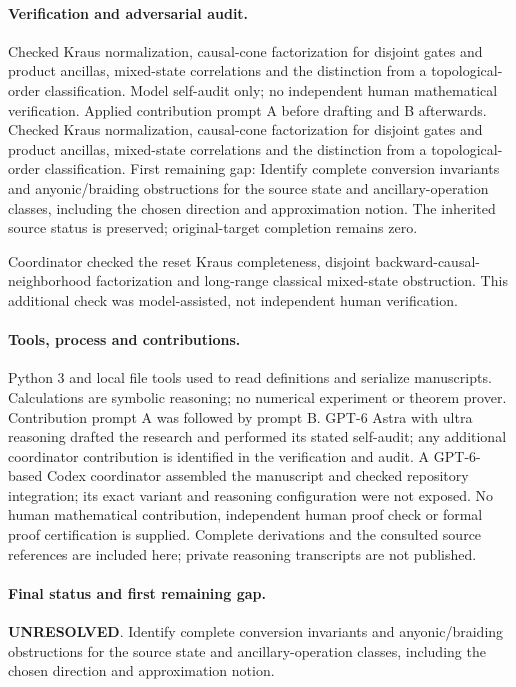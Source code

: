 \documentclass[11pt]{article}
\begin{document}
\paragraph{Verification and adversarial audit.}
Checked Kraus normalization, causal-cone factorization for disjoint gates and product ancillas, mixed-state correlations and the distinction from a topological-order classification. Model self-audit only; no independent human mathematical verification. Applied contribution prompt A before drafting and B afterwards. Checked Kraus normalization, causal-cone factorization for disjoint gates and product ancillas, mixed-state correlations and the distinction from a topological-order classification. First remaining gap: Identify complete conversion invariants and anyonic/braiding obstructions for the source state and ancillary-operation classes, including the chosen direction and approximation notion. The inherited source status is preserved; original-target completion remains zero.

Coordinator checked the reset Kraus completeness, disjoint backward-causal-neighborhood factorization and long-range classical mixed-state obstruction. This additional check was model-assisted, not independent human verification.

\paragraph{Tools, process and contributions.}
Python 3 and local file tools used to read definitions and serialize manuscripts. Calculations are symbolic reasoning; no numerical experiment or theorem prover. Contribution prompt A was followed by prompt B. GPT-6 Astra with ultra reasoning drafted the research and performed its stated self-audit; any additional coordinator contribution is identified in the verification and audit. A GPT-6-based Codex coordinator assembled the manuscript and checked repository integration; its exact variant and reasoning configuration were not exposed. No human mathematical contribution, independent human proof check or formal proof certification is supplied. Complete derivations and the consulted source references are included here; private reasoning transcripts are not published.

\paragraph{Final status and first remaining gap.}
\textbf{UNRESOLVED}. Identify complete conversion invariants and anyonic/braiding obstructions for the source state and ancillary-operation classes, including the chosen direction and approximation notion.
\end{document}
